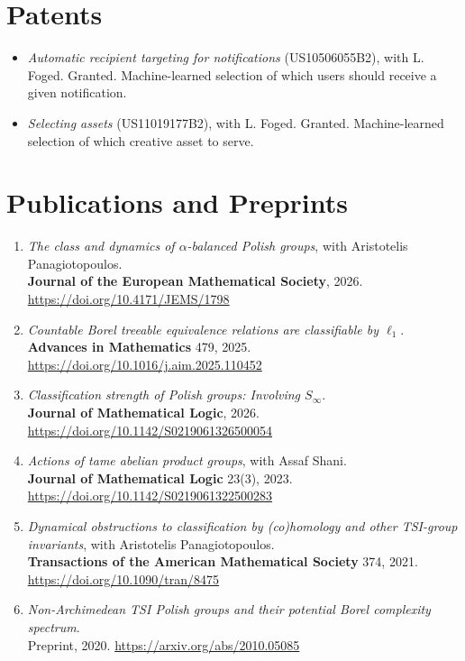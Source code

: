 \documentclass[letterpaper]{article}
\begin{document}
\section*{Patents}

\begin{itemize}
  \item \emph{Automatic recipient targeting for notifications} (US10506055B2),
        with L. Foged. Granted. Machine-learned selection of which users
        should receive a given notification.
  \item \emph{Selecting assets} (US11019177B2), with L. Foged. Granted.
        Machine-learned selection of which creative asset to serve.
\end{itemize}

\section*{Publications and Preprints}

\begin{enumerate}
  \item \emph{The class and dynamics of $\alpha$-balanced Polish groups}, with
        Aristotelis Panagiotopoulos.\\
        \textbf{Journal of the European Mathematical Society}, 2026.
        \url{https://doi.org/10.4171/JEMS/1798}

  \item \emph{Countable Borel treeable equivalence relations are classifiable
        by $\ell_1$}.\\
        \textbf{Advances in Mathematics} 479, 2025.
        \url{https://doi.org/10.1016/j.aim.2025.110452}

  \item \emph{Classification strength of Polish groups: Involving $S_\infty$}.\\
        \textbf{Journal of Mathematical Logic}, 2026.
        \url{https://doi.org/10.1142/S0219061326500054}

  \item \emph{Actions of tame abelian product groups}, with Assaf Shani.\\
        \textbf{Journal of Mathematical Logic} 23(3), 2023.
        \url{https://doi.org/10.1142/S0219061322500283}

  \item \emph{Dynamical obstructions to classification by (co)homology and
        other TSI-group invariants}, with Aristotelis Panagiotopoulos.\\
        \textbf{Transactions of the American Mathematical Society} 374, 2021.
        \url{https://doi.org/10.1090/tran/8475}

  \item \emph{Non-Archimedean TSI Polish groups and their potential Borel
        complexity spectrum}.\\
        Preprint, 2020. \url{https://arxiv.org/abs/2010.05085}
\end{enumerate}
\end{document}
